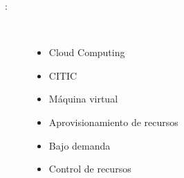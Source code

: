 \begin{description}
\item [\palabraschaveprincipal:] \mbox{} \\[-20pt]
\begin{itemize}
    \item Cloud Computing
    \item CITIC
    \item Máquina virtual
    \item Aprovisionamiento de recursos
    \item Bajo demanda
    \item Control de recursos
\end{itemize}
\end{description}

